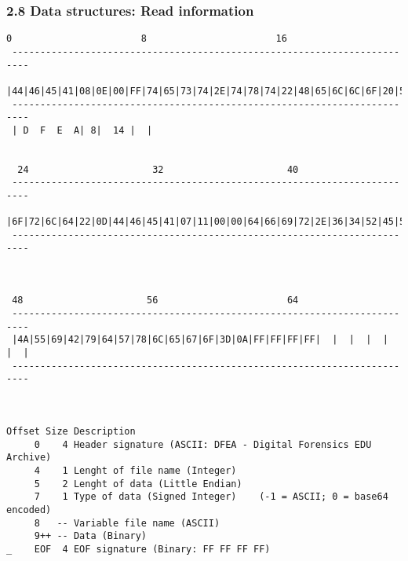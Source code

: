 \begin{frame}[fragile]
  \frametitle{2.8 Data structures: Read information}
\begin{lstlisting}[basicstyle=\tiny]
  0                       8                       16                      
 ------------------------------------------------------------------------- 
 |44|46|45|41|08|0E|00|FF|74|65|73|74|2E|74|78|74|22|48|65|6C|6C|6F|20|57|
 -------------------------------------------------------------------------
 | D  F  E  A| 8|  14 |  |                


  24                      32                      40
 -------------------------------------------------------------------------
 |6F|72|6C|64|22|0D|44|46|45|41|07|11|00|00|64|66|69|72|2E|36|34|52|45|5A|
 -------------------------------------------------------------------------
                   


 48                      56                       64
 -------------------------------------------------------------------------
 |4A|55|69|42|79|64|57|78|6C|65|67|6F|3D|0A|FF|FF|FF|FF|  |  |  |  |  |  |
 -------------------------------------------------------------------------



Offset Size Description
     0    4 Header signature (ASCII: DFEA - Digital Forensics EDU Archive)
     4    1 Lenght of file name (Integer)
     5    2 Lenght of data (Little Endian)
     7    1 Type of data (Signed Integer)    (-1 = ASCII; 0 = base64 encoded)
     8   -- Variable file name (ASCII)
     9++ -- Data (Binary)
_    EOF  4 EOF signature (Binary: FF FF FF FF)
\end{lstlisting}
\end{frame}


